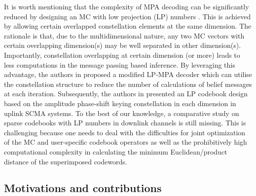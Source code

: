 \documentclass[journal]{IEEEtran}
\begin{document}
It is worth mentioning that  the complexity  of MPA decoding can be significantly  reduced by  designing an MC  with low projection   (LP) numbers \cite{bayesteh2015low,bao2017bit}. This is achieved by allowing  certain overlapped constellation elements at the same dimension. The rationale is that, due to the multidimensional nature, any two MC vectors with certain overlapping dimension(s) may be well separated in other  dimension(s). Importantly, constellation overlapping at certain dimension (or more) leads to less computations in the message passing based inference.  By leveraging this advantage, the authors in \cite{bayesteh2015low}  proposed a modified LP-MPA decoder which  can utilise the  constellation structure to reduce    the  number of calculations of  belief messages  at each iteration.     Subsequently, the authors in   \cite{bao2017bit} presented an LP codebook design based on   the amplitude phase-shift keying   constellation in each dimension in uplink SCMA systems.  
To the best of our knowledge, a comparative study on sparse codebooks  with LP numbers in downlink channels is still missing.  This is challenging because one  needs to deal with the difficulties for joint optimization of the MC and user-specific codebook operators as well as the prohibitively high computational complexity in calculating the minimum Euclidean/product distance  of  the superimposed codewords. 
 
 
 
 
 \subsection{Motivations and contributions} 
\end{document}
